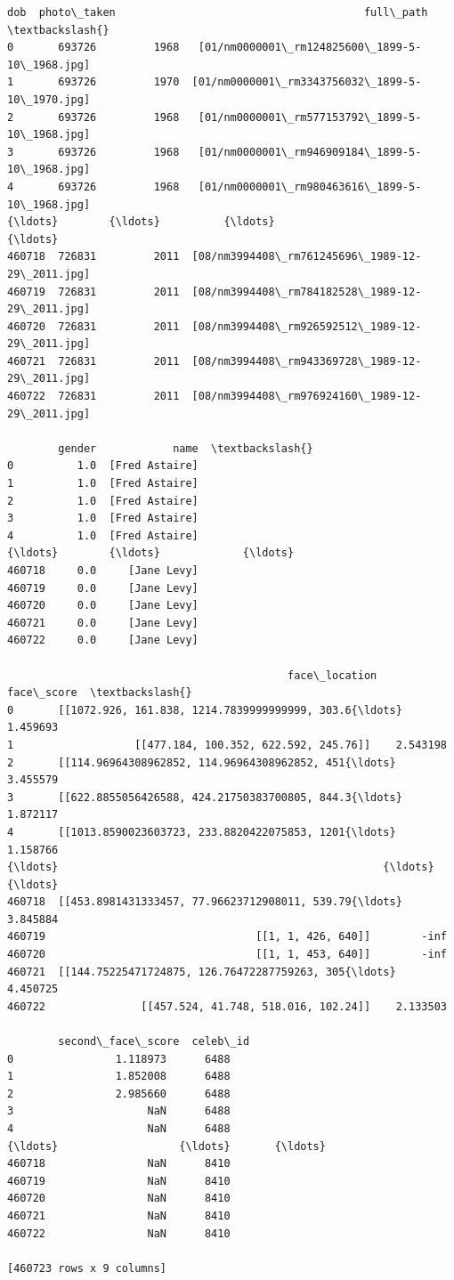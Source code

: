 \documentclass[11pt]{article}
\makeatletter
\newcommand{\boxspacing}{\kern\kvtcb@left@rule\kern\kvtcb@boxsep}
\newcommand{\prompt}[4]{
        \ttfamily\llap{{\color{#2}[#3]:\hspace{3pt}#4}}\vspace{-\baselineskip}
    }
\makeatother
\begin{document}
            \begin{tcolorbox}[breakable, size=fbox, boxrule=.5pt, pad at break*=1mm, opacityfill=0]
\prompt{Out}{outcolor}{6}{\boxspacing}
\begin{Verbatim}[commandchars=\\\{\}]
           dob  photo\_taken                                       full\_path  \textbackslash{}
0       693726         1968   [01/nm0000001\_rm124825600\_1899-5-10\_1968.jpg]
1       693726         1970  [01/nm0000001\_rm3343756032\_1899-5-10\_1970.jpg]
2       693726         1968   [01/nm0000001\_rm577153792\_1899-5-10\_1968.jpg]
3       693726         1968   [01/nm0000001\_rm946909184\_1899-5-10\_1968.jpg]
4       693726         1968   [01/nm0000001\_rm980463616\_1899-5-10\_1968.jpg]
{\ldots}        {\ldots}          {\ldots}                                             {\ldots}
460718  726831         2011  [08/nm3994408\_rm761245696\_1989-12-29\_2011.jpg]
460719  726831         2011  [08/nm3994408\_rm784182528\_1989-12-29\_2011.jpg]
460720  726831         2011  [08/nm3994408\_rm926592512\_1989-12-29\_2011.jpg]
460721  726831         2011  [08/nm3994408\_rm943369728\_1989-12-29\_2011.jpg]
460722  726831         2011  [08/nm3994408\_rm976924160\_1989-12-29\_2011.jpg]

        gender            name  \textbackslash{}
0          1.0  [Fred Astaire]
1          1.0  [Fred Astaire]
2          1.0  [Fred Astaire]
3          1.0  [Fred Astaire]
4          1.0  [Fred Astaire]
{\ldots}        {\ldots}             {\ldots}
460718     0.0     [Jane Levy]
460719     0.0     [Jane Levy]
460720     0.0     [Jane Levy]
460721     0.0     [Jane Levy]
460722     0.0     [Jane Levy]

                                            face\_location  face\_score  \textbackslash{}
0       [[1072.926, 161.838, 1214.7839999999999, 303.6{\ldots}    1.459693
1                   [[477.184, 100.352, 622.592, 245.76]]    2.543198
2       [[114.96964308962852, 114.96964308962852, 451{\ldots}    3.455579
3       [[622.8855056426588, 424.21750383700805, 844.3{\ldots}    1.872117
4       [[1013.8590023603723, 233.8820422075853, 1201{\ldots}    1.158766
{\ldots}                                                   {\ldots}         {\ldots}
460718  [[453.8981431333457, 77.96623712908011, 539.79{\ldots}    3.845884
460719                                 [[1, 1, 426, 640]]        -inf
460720                                 [[1, 1, 453, 640]]        -inf
460721  [[144.75225471724875, 126.76472287759263, 305{\ldots}    4.450725
460722               [[457.524, 41.748, 518.016, 102.24]]    2.133503

        second\_face\_score  celeb\_id
0                1.118973      6488
1                1.852008      6488
2                2.985660      6488
3                     NaN      6488
4                     NaN      6488
{\ldots}                   {\ldots}       {\ldots}
460718                NaN      8410
460719                NaN      8410
460720                NaN      8410
460721                NaN      8410
460722                NaN      8410

[460723 rows x 9 columns]
\end{Verbatim}
\end{tcolorbox}
        
\end{document}
